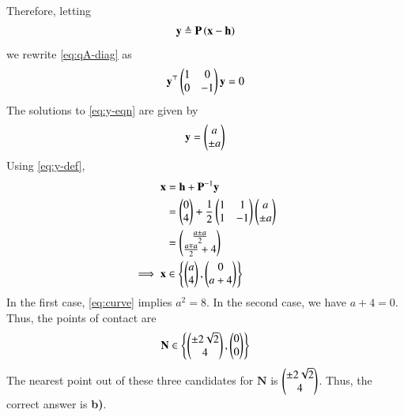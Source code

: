 \documentclass[journal,12pt,twocolumn]{IEEEtran}
\renewcommand{\vec}[1]{\boldsymbol{\mathbf{#1}}}
\begin{document}
\begin{enumerate}
\begin{align}
        \label{eq:Pl-vals}
    \end{align}
    Therefore, letting
    \begin{align}
        \vec{y} \triangleq \vec{P}\brak{\vec{x}-\vec{h}}
        \label{eq:y-def}
    \end{align}
    we rewrite \eqref{eq:qA-diag} as
    \begin{align}
        \vec{y}^\top\myvec{1&0\\0&-1}\vec{y} = 0
        \label{eq:y-eqn}
    \end{align}
    The solutions to \eqref{eq:y-eqn} are given by
    \begin{align}
        \vec{y} = \myvec{a\\\pm a}
        \label{eq:y-sol}
    \end{align}
    Using \eqref{eq:y-def},
    \begin{align}
        \vec{x} &= \vec{h} + \vec{P}^{-1}\vec{y} \\
                &= \myvec{0\\4} + \frac{1}{2}\myvec{1&1\\1&-1}\myvec{a\\\pm a} \\
                &= \myvec{\frac{a\pm a}{2}\\\frac{a\mp a}{2}+4} \\
        \implies \vec{x} &\in \cbrak{\myvec{a\\4},\myvec{0\\a+4}}
        \label{eq:x-case}
    \end{align}
    In the first case, \eqref{eq:curve} implies $a^2 = 8$. In the second case,
    we have $a + 4 = 0$. Thus, the points of contact are
    \begin{align}
        \vec{N} \in \cbrak{\myvec{\pm 2\sqrt{2}\\4},\myvec{0\\0}}
        \label{eq:poc-ans}
    \end{align}
    The nearest point out of these three candidates for $\vec{N}$ is
    $\begin{pmatrix}\pm2\sqrt{2}\\4\end{pmatrix}$. Thus, the correct answer is \textbf{b)}.


\end{enumerate}
\end{document}
